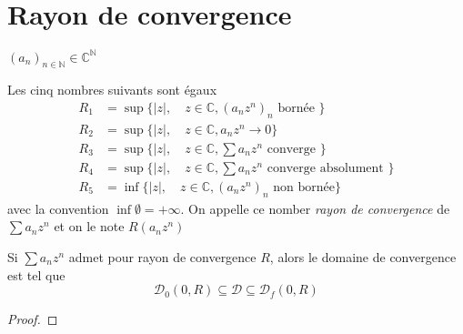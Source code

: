 \section{Rayon de convergence}
\begin{thmdef}
    \Hyp $(a_n)_{n\in\mathbb N}\in\mathbb C^{\mathbb N}$
    \begin{concenum}
    \item Les cinq nombres suivants sont égaux {\begin{align*}
                R_1 &= \sup\{|z|, \quad z\in\mathbb C, (a_nz^n)_n\text{ bornée }\} \\
                R_2 &= \sup\{|z|, \quad z\in\mathbb C, a_nz^n\longrightarrow 0\}\\
                R_3 &= \sup\{|z|, \quad z\in\mathbb C, \sum a_nz^n\text{ converge }\} \\
                R_4 &= \sup\{|z|, \quad z\in\mathbb C, \sum a_nz^n\text{ converge absolument }\} \\
                R_5 &= \inf\{|z|, \quad z\in\mathbb C, (a_nz^n)_n\text{ non bornée}\}
    \end{align*}
avec la convention $\inf\emptyset=+\infty$.}
    On appelle ce nomber \emph{rayon de convergence} de $\sum a_nz^n$ et on le note $R(a_nz^n)$
\item Si $\sum a_nz^n$ admet pour rayon de convergence $R$, alors le domaine de convergence est tel que \[
        \mathcal D_0(0, R)\subseteq \mathcal D\subseteq \mathcal D_f(0, R)
    \]
    \end{concenum}
\end{thmdef}

\begin{proof}
    
\end{proof}
